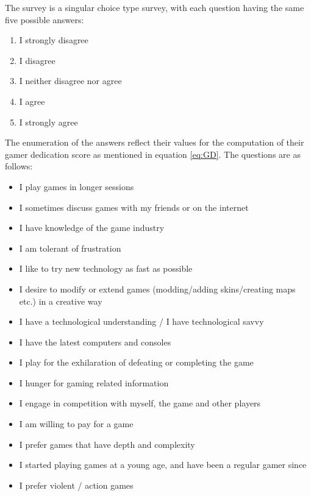 The survey is a singular choice type survey, with each question having the same five possible answers:

\begin{enumerate}
\item I strongly disagree
\item I disagree
\item I neither disagree nor agree
\item I agree
\item I strongly agree
\end{enumerate}

The enumeration of the answers reflect their values for the computation of their gamer dedication score as mentioned in equation \ref{eq:GD}.
The questions are as follows:

\begin{itemize}
\item I play games in longer sessions
\item I sometimes discuss games with my friends or on the internet
\item I have knowledge of the game industry
\item I am tolerant of frustration
\item I like to try new technology as fast as possible
\item I desire to modify or extend games (modding/adding skins/creating maps etc.) in a creative way
\item I have a technological understanding / I have technological savvy
\item I have the latest computers and consoles
\item I play for the exhilaration of defeating or completing the game
\item I hunger for gaming related information
\item I engage in competition with myself, the game and other players
\item I am willing to pay for a game
\item I prefer games that have depth and complexity
\item I started playing games at a young age, and have been a regular gamer since
\item I prefer violent / action games
\end{itemize}
